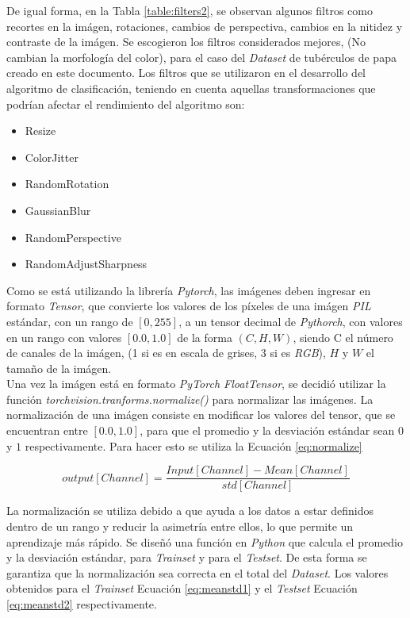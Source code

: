 \newpage
De igual forma, en la Tabla \ref{table:filters2}, se observan algunos filtros como recortes en la imágen, rotaciones, cambios de perspectiva, cambios en la nitidez y contraste de la imágen. Se escogieron los filtros considerados mejores, (No cambian la morfología del color), para el caso del \textit{Dataset} de tubérculos de papa creado en este documento. Los filtros que se utilizaron en el desarrollo del algoritmo de clasificación, teniendo en cuenta aquellas transformaciones que podrían afectar el rendimiento del algoritmo son:

\begin{itemize}
	\item Resize
	\item ColorJitter
	\item RandomRotation
	\item GaussianBlur
	\item RandomPerspective
	\item RandomAdjustSharpness
\end{itemize}

Como se está utilizando la librería \textit{Pytorch}, las imágenes deben ingresar en formato \textit{Tensor}, que convierte los valores de los píxeles de una imágen \textit{PIL} estándar, con un rango de $[0, 255]$,  a un tensor decimal de \textit{Pythorch}, con valores en un rango con valores $[0.0, 1.0]$ de la forma  $(C, H, W)$, siendo C el número de canales de la imágen, (1 si es en escala de grises, 3 si es \textit{RGB}), $H$ y $W$ el tamaño de la imágen. \\

Una vez la imágen está en formato \textit{PyTorch FloatTensor}, se decidió utilizar la función \textit{torchvision.tranforms.normalize()} para normalizar las imágenes. La normalización de una imágen consiste en modificar los valores del tensor, que se encuentran entre $[0.0, 1.0]$, para que el promedio y la desviación estándar sean $0$ y $1$ respectivamente. Para hacer esto se utiliza la Ecuación \ref{eq:normalize} \cite{Pytorch}

\begin{equation}
	{output[Channel]=\frac{Input[Channel]-Mean[Channel]}{std[Channel]}}
	\label{eq:normalize}
\end{equation}

La normalización se utiliza debido a que ayuda a los datos a estar definidos dentro de un rango y reducir la asimetría entre ellos, lo que permite un aprendizaje más rápido. Se diseñó una función en \textit{Python} que calcula el promedio y la desviación estándar, para \textit{Trainset} y para el \textit{Testset}. De esta forma se garantiza que la normalización sea correcta en el total del \textit{Dataset}. Los valores obtenidos para el \textit{Trainset} Ecuación \ref{eq:meanstd1} y el \textit{Testset} Ecuación \ref{eq:meanstd2} respectivamente.

